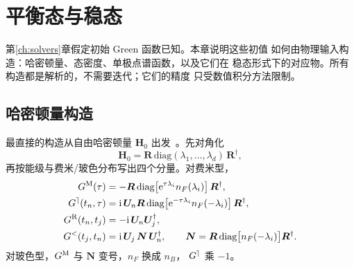 \chapter{平衡态与稳态}
\label{ch:equilibrium}

第\ref{ch:solvers}章假定初始 Green 函数已知。本章说明这些初值
如何由物理输入构造：哈密顿量、态密度、单极点谱函数，以及它们在
稳态形式下的对应物。所有构造都是解析的，不需要迭代；它们的精度
只受数值积分方法限制。

\section{哈密顿量构造}
\label{sec:from-ham}

最直接的构造从自由哈密顿量 $\bm{H}_0$ 出发~\cite{aoki2014}。先对角化
\begin{equation}
    \bm{H}_0 = \bm{R}\,\mathrm{diag}(\lambda_1,\dots,\lambda_d)\,
    \bm{R}^{\dagger},
\end{equation}
再按能级与费米/玻色分布写出四个分量。对费米型，
\begin{align}
    G^{\mathrm{M}}(\tau) &= -\bm{R}\,
        \mathrm{diag}\big[\mathrm{e}^{\tau\lambda_i}n_F(\lambda_i)\big]\,
        \bm{R}^{\dagger},\\
    G^{\rceil}(t_n,\tau) &= \mathrm{i}\,\bm{U}_n\bm{R}\,
        \mathrm{diag}\big[\mathrm{e}^{-\tau\lambda_i}n_F(-\lambda_i)\big]\,
        \bm{R}^{\dagger},\\
    G^{\mathrm{R}}(t_n,t_j) &= -\mathrm{i}\,\bm{U}_n\bm{U}^{\dagger}_j,\\
    G^{<}(t_j,t_n) &= \mathrm{i}\,\bm{U}_j\,\bm{N}\,\bm{U}^{\dagger}_n,
    \qquad \bm{N} = \bm{R}\,
        \mathrm{diag}\big[n_F(-\lambda_i)\big]\bm{R}^{\dagger}.
    \label{eq:from-ham}
\end{align}
对玻色型，$G^{\mathrm{M}}$ 与 $\bm{N}$ 变号，$n_F$ 换成 $n_B$，
$G^{\rceil}$ 乘 $-1$。

